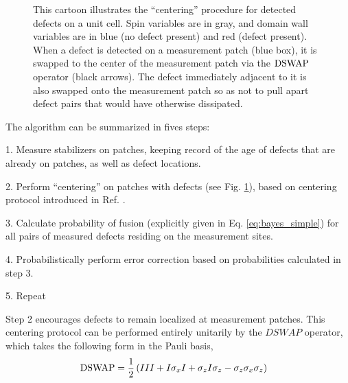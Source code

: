 \documentclass[twocolumn,superscriptaddress,aps,prb,floatfix]{revtex4-1}
\newcommand{\figref}[1]{Fig. \ref{#1}}
\begin{document}
\begin{figure}
\begin{center}
\end{center}
\caption{This cartoon illustrates the ``centering'' procedure for detected defects on a unit cell.  Spin variables are in gray, and domain wall variables are in blue (no defect present) and red (defect present).  When a defect is detected on a measurement patch (blue box), it is swapped to the center of the measurement patch via the $\rm{DSWAP}$ operator (black arrows).  The defect immediately adjacent to it is also swapped onto the measurement patch so as not to pull apart defect pairs that would have otherwise dissipated.}
\label{fig:detect_swap}
\end{figure}

The algorithm can be summarized in fives steps:

1. Measure stabilizers on patches, keeping record of the age of defects that are already on patches, as well as defect locations.  

2. Perform ``centering'' on patches with defects (see \figref{fig:detect_swap}), based on centering protocol introduced in Ref. \cite{Freeman2016}.

3. Calculate probability of fusion (explicitly given in Eq. \ref{eq:bayes_simple}) for all pairs of measured defects residing on the measurement sites.

4. Probabilistically perform error correction based on probabilities calculated in step 3.

5. Repeat

Step 2 encourages defects to remain localized at measurement patches.  This centering protocol can be performed entirely unitarily by the $DSWAP$ operator, which takes the following form in the Pauli basis,
\begin{align}
\rm{DSWAP} &= \frac{1}{2} \left(III + I\sigma_x I + \sigma_z I \sigma_z - \sigma_z \sigma_x \sigma_z \right)
\end{align}
\end{document}
